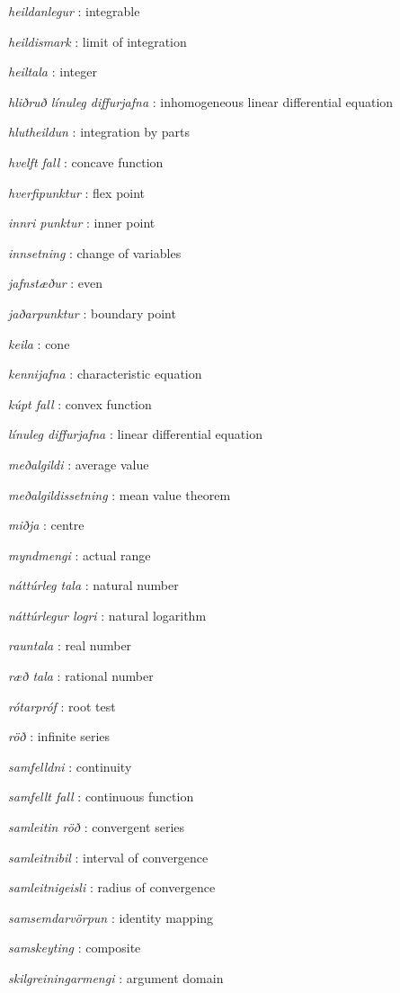 \documentclass[a4paper,10pt,icelandic]{sphinxmanual}
\begin{document}
\emph{heildanlegur} : integrable


\emph{heildismark} : limit of integration


\emph{heiltala} : integer

\emph{hliðruð línuleg diffurjafna} : inhomogeneous linear differential equation

\emph{hlutheildun} : integration by parts

\emph{hvelft fall} : concave function


\emph{hverfipunktur} : flex point

\emph{innri punktur} : inner point

\emph{innsetning} : change of variables

\emph{jafnstæður} : even


\emph{jaðarpunktur} : boundary point

\emph{keila} : cone


\emph{kennijafna} : characteristic equation


\emph{kúpt fall} : convex function


\emph{línuleg diffurjafna} : linear differential equation


\emph{meðalgildi} : average value

\emph{meðalgildissetning} : mean value theorem


\emph{miðja} : centre

\emph{myndmengi} : actual range

\emph{náttúrleg tala} : natural number


\emph{náttúrlegur logri} : natural logarithm


\emph{rauntala} : real number


\emph{ræð tala} : rational number


\emph{rótarpróf} : root test


\emph{röð} : infinite series

\emph{samfelldni} : continuity


\emph{samfellt fall} : continuous function


\emph{samleitin röð} : convergent series


\emph{samleitnibil} : interval of convergence


\emph{samleitnigeisli} : radius of convergence


\emph{samsemdarvörpun} : identity mapping


\emph{samskeyting} : composite


\emph{skilgreiningarmengi} : argument domain
\end{document}
